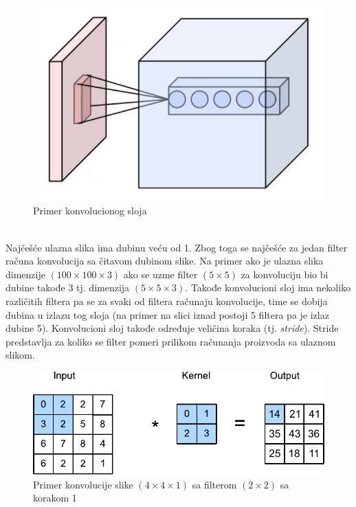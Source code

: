 \documentclass[a4paper,fleqn,12pt]{JMThesis}
\theoremstyle{plain}
\theoremstyle{definition}
\theoremstyle{definition}
\begin{document}
\begin{figure}[!ht]
	\centering
    \includegraphics[scale=0.4]{../graph-visuals/conv-filter.png}
	\caption{Primer konvolucionog sloja}
\end{figure}\\
Najčešće ulazna slika ima dubinu veću od 1. Zbog toga se najčešće za jedan filter računa konvolucija sa čitavom dubinom slike.
Na primer ako je ulazna slika dimenzije $(100 \times 100 \times 3)$ ako se uzme filter $(5 \times 5)$ za konvoluciju bio bi 
dubine takođe 3 tj. dimenzija $(5 \times 5 \times 3)$. Takođe konvolucioni sloj ima nekoliko različitih filtera pa se za svaki od
filtera računaju konvolucije, time se dobija dubina u izlazu tog sloja (na primer na slici iznad postoji 5 filtera pa je izlaz dubine 5).
Konvolucioni sloj takođe određuje veličina koraka (tj. \textit{stride}). Stride predstavlja za koliko se filter pomeri prilikom računanja
proizvoda sa ulaznom slikom. 
\begin{figure}[!ht]
	\centering
    \includegraphics[scale=1]{../graph-visuals/convolution-operation-stride-1.pdf}
	\caption{Primer konvolucije slike $(4 \times 4 \times 1)$ sa filterom $(2 \times 2)$ sa korakom 1}
\end{figure}\\
\end{document}
